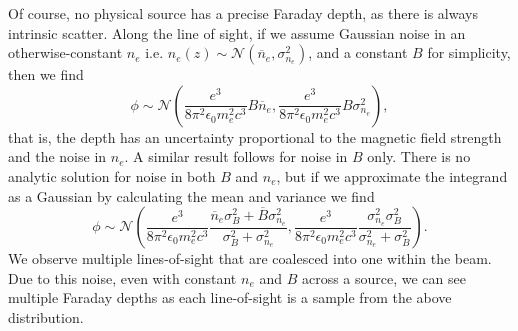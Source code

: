        Of course, no physical source has a precise Faraday depth, as there is always intrinsic scatter. Along the line of sight, if we assume Gaussian noise in an otherwise-constant $n_e$ i.e. $n_e(z) \sim \mathcal N(\overline n_e, \sigma_{n_e}^2)$, and a constant $B$ for simplicity, then we find
        \begin{equation}
            \phi \sim \mathcal N\left(\frac{e^3}{8\pi^2\epsilon_0m_e^2c^3} B \overline n_e, \frac{e^3}{8\pi^2\epsilon_0m_e^2c^3} B \sigma_{n_e}^2\right),
        \end{equation}
        that is, the depth has an uncertainty proportional to the magnetic field strength and the noise in $n_e$. A similar result follows for noise in $B$ only. There is no analytic solution for noise in both $B$ and $n_e$, but if we approximate the integrand as a Gaussian by calculating the mean and variance we find
        \begin{equation}
            \phi \sim \mathcal N\left(\frac{e^3}{8\pi^2\epsilon_0m_e^2c^3} \frac{\overline n_e \sigma_B^2 + \overline B \sigma_{n_e}^2}{\sigma_B^2 + \sigma_{n_e}^2}, \frac{e^3}{8\pi^2\epsilon_0m_e^2c^3} \frac{\sigma_{n_e}^2 \sigma_B^2}{\sigma_{n_e}^2 + \sigma_B^2}\right).
        \end{equation}
        We observe multiple lines-of-sight that are coalesced into one within the beam. Due to this noise, even with constant $n_e$ and $B$ across a source, we can see multiple Faraday depths as each line-of-sight is a sample from the above distribution.




